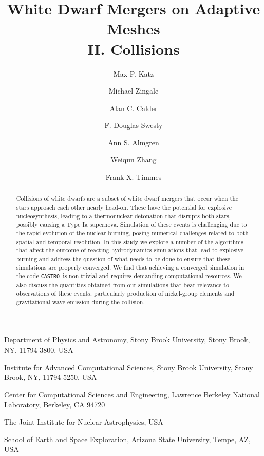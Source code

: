 \documentclass[twocolumn,numberedappendix]{../aastex6}
\newcommand{\castro}{\texttt{CASTRO}}
\begin{document}
\title{White Dwarf Mergers on Adaptive Meshes\\ II. Collisions}


\author{Max P. Katz}
\author{Michael Zingale}
\author{Alan C. Calder}
\author{F. Douglas Swesty}
\author{Ann S. Almgren}
\author{Weiqun Zhang}
\author{Frank X. Timmes}

{
  Department of Physics and Astronomy,
  Stony Brook University, Stony Brook, NY, 11794-3800, USA
}

{
  Institute for Advanced Computational Sciences,
  Stony Brook University, Stony Brook, NY, 11794-5250, USA
}

{
  Center for Computational Sciences and Engineering,
  Lawrence Berkeley National Laboratory, Berkeley, CA 94720
}

{
  The Joint Institute for Nuclear Astrophysics, USA
}

{
  School of Earth and Space Exploration, Arizona State University, Tempe, AZ, USA
}



\begin{abstract}
Collisions of white dwarfs are a subset of white dwarf mergers that occur
when the stars approach each other nearly head-on. These have the potential
for explosive nucleosynthesis, leading to a thermonuclear detonation that
disrupts both stars, possibly causing a Type Ia supernova. Simulation of
these events is challenging due to the rapid evolution of the nuclear burning,
posing numerical challenges related to both spatial and temporal resolution.
In this study we explore a number of the algorithms that affect the outcome
of reacting hydrodynamics simulations that lead to explosive burning and
address the question of what needs to be done to ensure that these simulations
are properly converged. We find that achieving a converged simulation in the
code \castro\ is non-trivial and requires demanding computational resources.
We also discuss the quantities obtained from our simulations that bear relevance
to observations of these events, particularly production of nickel-group
elements and gravitational wave emission during the collision.
\end{abstract}
\end{document}
